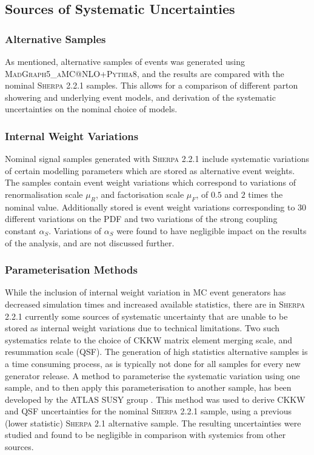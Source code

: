 \subsection{Sources of Systematic Uncertainties}

%

%
\subsubsection{Alternative Samples}
As mentioned, alternative samples of \Vjets events was generated using \textsc{MadGraph5\_aMC@NLO+Pythia8}, and the results are compared with the nominal \textsc{Sherpa 2.2.1} samples. This allows for a comparison of different parton showering and underlying event models, and derivation of the systematic uncertainties on the nominal choice of models.

\subsubsection{Internal Weight Variations}
Nominal signal samples generated with \textsc{Sherpa 2.2.1} include systematic variations of certain modelling parameters which are stored as alternative event weights. The samples contain event weight variations which correspond to variations of renormalisation scale $\mu_R$, and factorisation scale $\mu_F$, of $0.5$ and $2$ times the nominal value. Additionally stored is event weight variations corresponding to $30$ different variations on the PDF and two variations of the strong coupling constant $\alpha_S$. Variations of $\alpha_S$ were found to have negligible impact on the results of the analysis, and are not discussed further. 

\subsubsection{Parameterisation Methods}
While the inclusion of internal weight variation in MC event generators has decreased simulation times and increased available statistics, there are in \textsc{Sherpa 2.2.1} currently some sources of systematic uncertainty that are unable to be stored as internal weight variations due to technical limitations. Two such systematics relate to the choice of CKKW matrix element merging scale, and resummation scale (QSF). The generation of high statistics alternative samples is a time consuming process, as is typically not done for all samples for every new generator release. A method to parameterise the systematic variation using one sample, and to then apply this parameterisation to another sample, has been developed by the ATLAS SUSY group \cite{Anders:2125718}. This method was used to derive CKKW and QSF uncertainties for the nominal \textsc{Sherpa 2.2.1} sample, using a previous (lower statistic) \textsc{Sherpa 2.1} alternative sample. The resulting uncertainties were studied and found to be negligible in comparison with systemics from other sources.


